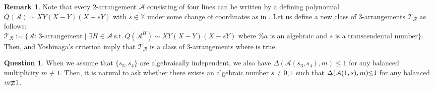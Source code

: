 \documentclass[12pt]{amsart}
\theoremstyle{definition}
\newtheorem{corollary}[definition]{Corollary}
\newtheorem{remark}[definition]{Remark}
\newtheorem{question}[definition]{Question}
\newcommand{\KK}{\mathbb{K}}
\newcommand{\AAA}{\mathcal{A}}
\newcommand{\BBB}{\mathcal{B}}
\newcommand{\suchthat}{\text{s.t.}}
\begin{document}
\begin{remark}
Note that every %
$2$-arrangement $\AAA$ consisting of four lines 
can be written by a defining polynomial 
$Q(\AAA)\sim XY(X-Y)(X-sY)$ with $s\in\KK$ under some 
change of coordinates %
as in . 
Let us define a new class of $3$-arrangements $\mathcal{T}_\mathcal{R}$ as follows: 
$\mathcal{T}_\mathcal{R}:=\{\AAA \text{: $3$-arrangement} \mid 
\exists H \in \AAA\ \suchthat\ Q(\AAA^H)\sim XY(X-Y)(X-sY) 
\text{ where %
$s$ is a transcendental number}\}$. 
Then,  and Yoshinaga's criterion imply that %
    $\mathcal{T}_\mathcal{R}$ is a class of $3$-arrangements 
    where  is true. 
\end{remark}
\begin{question}
When we assume that $\{s_3,s_4\}$ are algebraically independent, we also have $\Delta(\AAA(s_3,s_4),m)\leq1$ for any balanced multiplicity $m\not\equiv1$. 
Then, %
it is natural to ask whether there exists an algebraic number \hspace{-1.5mm} 
$s\neq0,1$ \hspace{-1.5mm}
such \hspace{-1.5mm} that \hspace{-0.7mm} 
$\Delta(\AAA(1,s),m)\hspace{-1.0mm}\leq\hspace{-1.0mm}1$ \hspace{-1.3mm}
for any balanced \hspace{-1.7mm} %
$m\hspace{-1.0mm}\not\equiv\hspace{-1.0mm} 1$. 
\end{question}

\end{document}
